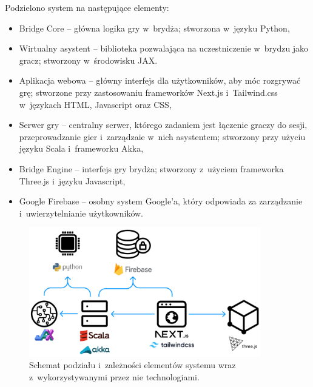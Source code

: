 Podzielono system na następujące elementy:
\begin{itemize}
  \item Bridge Core -- główna logika gry w~brydża; stworzona
        w~języku Python,

  \item Wirtualny asystent -- biblioteka pozwalająca na uczestniczenie
        w~brydzu jako gracz; stworzony w~środowisku JAX.

  \item Aplikacja webowa -- główny interfejs dla użytkowników,
        aby móc rozgrywać grę; stworzone przy zastosowaniu
        frameworków Next.js i~Tailwind.css w~językach HTML, \mbox{Javascript}
        oraz CSS,

  \item Serwer gry -- centralny serwer, którego zadaniem jest
        łączenie graczy do sesji, przeprowadzanie gier i~zarządzaie
        w~nich asystentem; stworzony przy użyciu języku Scala
        \mbox{i~frameworku} Akka,

  \item Bridge Engine -- interfejs gry brydża; stworzony
        z~użyciem frameworka Three.js i~języku Javascript,

  \item Google Firebase -- osobny system Google'a, który
        odpowiada za zarządzanie i~uwierzytelnianie użytkowników.
\end{itemize}

\begin{figure}[h!]
  \centering
  \includegraphics[width=0.9\textwidth]{img/schematy/schemat_systemu.png}
  \caption{Schemat podziału i~zależności elementów systemu wraz z~wykorzystywanymi przez nie technologiami.}
  \label{fig:system-scheme}
\end{figure}

\FloatBarrier


